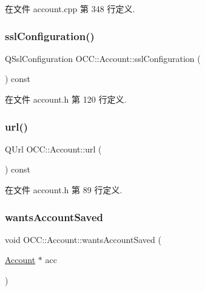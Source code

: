 在文件 account.\+cpp 第 348 行定义.

\mbox{\label{class_o_c_c_1_1_account_aab78889837ce507c78a70dc19fa743b2}} 
\subsubsection{\texorpdfstring{ssl\+Configuration()}{sslConfiguration()}}
{\footnotesize\ttfamily Q\+Ssl\+Configuration O\+C\+C\+::\+Account\+::ssl\+Configuration (\begin{DoxyParamCaption}{ }\end{DoxyParamCaption}) const}



在文件 account.\+h 第 120 行定义.

\mbox{\label{class_o_c_c_1_1_account_a8aa1b92581de450a356a51ad8760d1f1}} 
\subsubsection{\texorpdfstring{url()}{url()}}
{\footnotesize\ttfamily Q\+Url O\+C\+C\+::\+Account\+::url (\begin{DoxyParamCaption}{ }\end{DoxyParamCaption}) const}



在文件 account.\+h 第 89 行定义.

\mbox{\label{class_o_c_c_1_1_account_ade354858c36394bc2327828a16fa9e36}} 
\subsubsection{\texorpdfstring{wants\+Account\+Saved}{wantsAccountSaved}}
{\footnotesize\ttfamily void O\+C\+C\+::\+Account\+::wants\+Account\+Saved (\begin{DoxyParamCaption}\item[{\hyperlink{class_o_c_c_1_1_account}{Account} $\ast$}]{acc }\end{DoxyParamCaption})\hspace{0.3cm}{\ttfamily [signal]}}



